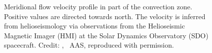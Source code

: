 \begin{figure}[htb]
\begin{floatrow}
{		}{
			\caption[Credit: {\citet[][Fig.~4,\,panel~a]{Zhao2013}, \textcopyright~AAS, reproduced with permission.}]
			{Meridional flow velocity profile in part of the convection zone. Positive values are directed towards north. The velocity is inferred from helioseismology via observations from the Helioseismic Magnetic Imager (HMI) at the Solar Dynamics Observatory (SDO) spacecraft. Credit: \citet[][Fig.~4,\,panel~a]{Zhao2013}, \textcopyright~AAS, reproduced with permission.}
			\label{fig:Zhao2013_meridional_flow}
		}
	\end{floatrow}
\end{figure}

